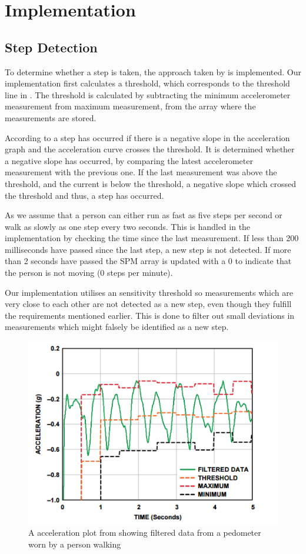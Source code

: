 \section{Implementation}
\subsection{Step Detection}\label{sec:stepCnt}
To determine whether a step is taken, the approach taken by \citet{zhao:pedometer} is implemented. Our implementation first calculates a threshold, which corresponds to the threshold line in . The threshold is calculated by subtracting the minimum accelerometer measurement from maximum measurement, from the array where the measurements are stored.

According to \citet[p. 2]{zhao:pedometer} a step has occurred if there is a negative slope in the acceleration graph and the acceleration curve crosses the threshold. It is determined whether a negative slope has occurred, by comparing the latest accelerometer measurement with the previous one. If the last measurement was above the threshold, and the current is below the threshold, a negative slope which crossed the threshold and thus, a step has occurred.

As \citet[p. 2]{zhao:pedometer} we assume that a person can either run as fast as five steps per second or walk as slowly as one step every two seconds. This is handled in the implementation by checking the time since the last measurement. If less than 200 milliseconds have passed since the last step, a new step is not detected. If more than 2 seconds have passed the SPM array is updated with a 0 to indicate that the person is not moving (0 steps per minute).

Our implementation utilises an sensitivity threshold so measurements which are very close to each other are not detected as a new step, even though they fulfill the requirements mentioned earlier. This is done to filter out small deviations in measurements which might falsely be identified as a new step.
\begin{figure}[h!]
  \centering
    \includegraphics[scale=0.8]{Images/accPlot.png}
  \caption{A acceleration plot from \citet[p. 2]{zhao:pedometer} showing filtered data from a pedometer worn by a person walking}
  \label{fig:zhaoGraph}
\end{figure}
